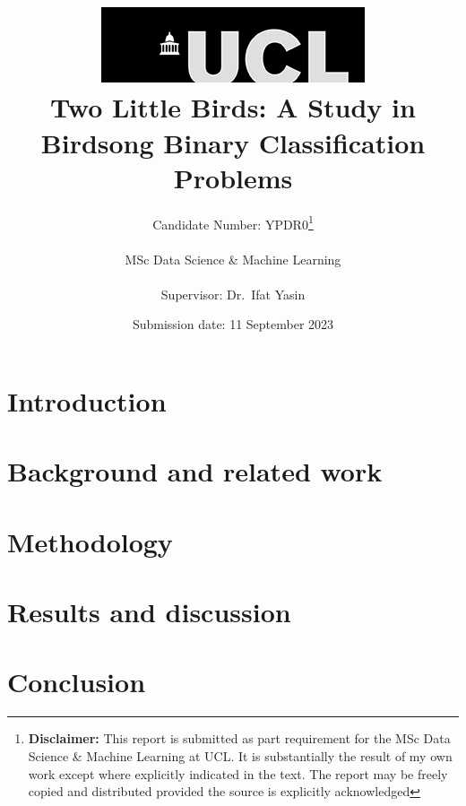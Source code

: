 \documentclass[12pt]{report}
\title{  	{ \includegraphics[scale=.5]{ucl_logo.png}}\\
{{\Huge Two Little Birds: A Study in Birdsong Binary Classification Problems}}\\
}
\date{Submission date: 11 September 2023}
\author{Candidate Number: YPDR0\thanks{
{\bf Disclaimer:}
This report is submitted as part requirement for the MSc Data Science \& Machine
Learning at UCL. It is substantially the result of my own work except where
explicitly indicated in the text. The report may be freely copied and
distributed provided the source is explicitly acknowledged
}
\\ \\
MSc Data Science \& Machine Learning\\ \\
Supervisor: Dr.\ Ifat Yasin}
\begin{document}
 
 \onehalfspacing
\maketitle
\begin{abstract}

\end{abstract}
\tableofcontents
\setcounter{page}{1}


\chapter{Introduction}\label{cp:intro}


\chapter{Background and related work}


\chapter{Methodology}


\chapter{Results and discussion}


\chapter{Conclusion}


\appendix



\end{document}
